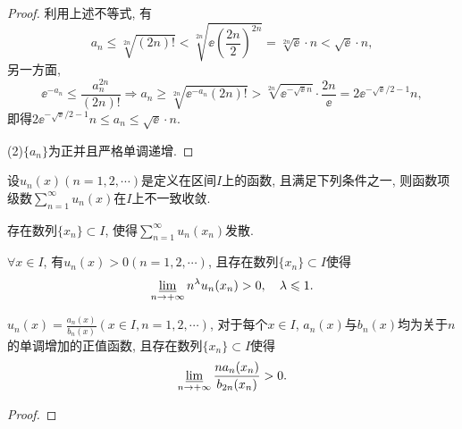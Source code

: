 \begin{quizb}
\begin{proof}
利用上述不等式, 有\[a_n\leqslant\sqrt[2n]{(2n)!}<\sqrt[2n]{\ee\left(\frac{2n}{2}\right)^{2n}}=\sqrt[2n]{\ee}\cdot n<\sqrt{\ee}\cdot n,\]另一方面,\[\ee^{-a_n}\leqslant\frac{a_n^{2n}}{(2n)!}\Rightarrow a_n\geqslant\sqrt[2n]{\ee^{-a_n}(2n)!}>\sqrt[2n]{\ee^{-\sqrt{\ee} n}}\cdot \frac{2n}{\ee}=2\ee^{-\sqrt{\ee}/2-1}n,\]即得\(2\ee^{-\sqrt{\ee}/2-1}n\leqslant a_n\leqslant\sqrt{\ee}\cdot n.\)

(2)\(\{a_n\}\)为正并且严格单调递增.
\end{proof}
\end{quizb}
设\(u_n(x)(n=1,2,\cdots)\)是定义在区间\(I\)上的函数, 且满足下列条件之一, 则函数项级数\(\sum_{n=1}^{\infty}u_n(x)\)在\(I\)上不一致收敛.
\begin{compactenum}[(1)]
\item 存在数列\(\{x_n\}\subset I\), 使得\(\sum_{n=1}^{\infty}u_n(x_n)\)发散.
\item \(\forall x\in I\), 有\(u_n(x)>0(n=1,2,\cdots)\), 且存在数列\(\{x_n\}\subset I\)使得\[\varliminf_{n\rightarrow+\infty}n^\lambda u_n(x_n)>0,\quad \lambda\leqslant 1.\]
\item \(u_n(x)=\frac{a_n(x)}{b_n(x)}(x\in I,n=1,2,\cdots)\), 对于每个\(x\in I\), \(a_n(x)\)与\(b_n(x)\)均为关于\(n\)的单调增加的正值函数, 且存在数列\(\{x_n\}\subset I\)使得\[\varliminf_{n\rightarrow+\infty}\frac{na_n(x_n)}{b_{2n}(x_n)}>0.\]
\begin{proof}

\end{proof}
\end{compactenum}

